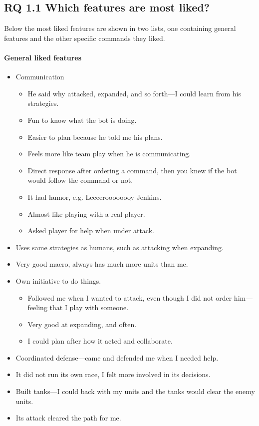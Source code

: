 \subsection{RQ 1.1 Which features are most liked?}
Below the most liked features are shown in two lists, one containing general features and the other
specific commands they liked.
\paragraph{General liked features}
\begin{itemize}
	\item Communication
	\begin{itemize}
		\item He said why attacked, expanded, and so forth—I could learn from his strategies.
		\item Fun to know what the bot is doing.
		\item Easier to plan because he told me his plans.
		\item Feels more like team play when he is communicating.
		\item Direct response after ordering a command, then you knew if the bot would follow the command or not.
		\item It had humor, e.g. Leeeeroooooooy Jenkins.
		\item Almost like playing with a real player.
		\item Asked player for help when under attack.
	\end{itemize}
	\item Uses same strategies as humans, such as attacking when expanding.
	\item Very good macro, always has much more units than me.
	\item Own initiative to do things.
	\begin{itemize}
		\item Followed me when I wanted to attack, even though I did not order him—feeling that I play with someone.
		\item Very good at expanding, and often.
		\item I could plan after how it acted and collaborate.
	\end{itemize}
	\item Coordinated defense—came and defended me when I needed help.
	\item It did not run its own race, I felt more involved in its decisions.
	\item Built tanks—I could back with my units and the tanks would clear the enemy units.
	\item Its attack cleared the path for me.
\end{itemize}

